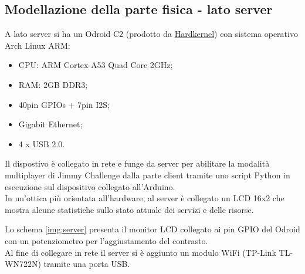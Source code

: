 \subsection{Modellazione della parte fisica - lato server}
A lato server si ha un Odroid C2 (prodotto da \href{http://www.hardkernel.com/main/main.php}{Hardkernel}) con sistema operativo Arch Linux ARM:
\begin{itemize}
	\item CPU: ARM Cortex-A53 Quad Core 2GHz;
	\item RAM: 2GB DDR3;
	\item 40pin GPIOs + 7pin I2S;
	\item Gigabit Ethernet;
	\item 4 x USB 2.0.
\end{itemize}
Il dispostivo è collegato in rete e funge da server per abilitare la modalità multiplayer di Jimmy Challenge dalla parte client tramite uno script Python in esecuzione sul dispositivo collegato all'Arduino.\\
In un'ottica più orientata all'hardware, al server è collegato un LCD 16x2 che mostra alcune statistiche sullo stato attuale dei servizi e delle risorse.

Lo schema \ref{img:server} presenta il monitor LCD collegato ai pin GPIO del Odroid con un potenziometro per l'aggiustamento del contrasto.\\
Al fine di collegare in rete il server si è aggiunto un modulo WiFi (TP-Link TL-WN722N) tramite una porta USB.

